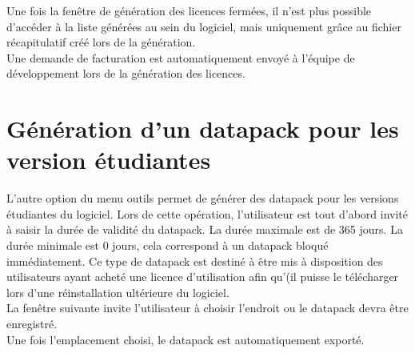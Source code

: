 Une fois la fenêtre de génération des licences fermées, il n'est plus possible d'accéder à la liste générées au sein du logiciel, mais uniquement grâce au fichier récapitulatif créé lors de la génération.\\

Une demande de facturation est automatiquement envoyé à l'équipe de développement lors de la génération des licences.

\section{Génération d'un datapack pour les version étudiantes}

L'autre option du menu outils permet de générer des datapack pour les versions étudiantes du logiciel. Lors de cette opération, l'utilisateur est tout d'abord invité à saisir la durée de validité du datapack. La durée maximale est de 365 jours. La durée minimale est 0 jours, cela correspond à un datapack bloqué immédiatement. Ce type de datapack est destiné à être mis à disposition des utilisateurs ayant acheté une licence d'utilisation afin qu'(il puisse le télécharger lors d'une réinstallation ultérieure du logiciel.\\

La fenêtre suivante invite l'utilisateur à choisir l'endroit ou le datapack devra être enregistré.\\

Une fois l'emplacement choisi, le datapack est automatiquement exporté.\\


